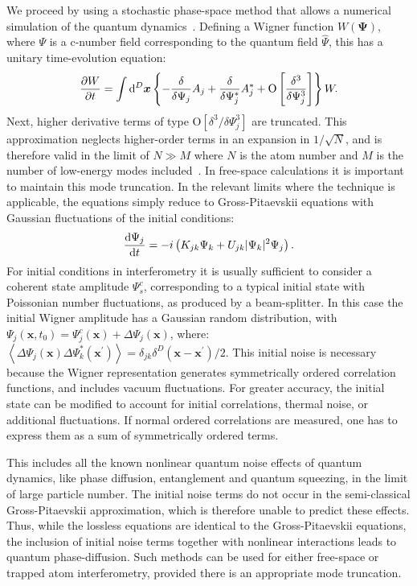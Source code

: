 \documentclass[doublecol]{epl2}
\newcommand{\xvec}{\boldsymbol{x}}
\newcommand{\Psivec}{\boldsymbol{\Psi}}
\begin{document}
We proceed by using a stochastic phase-space method that allows a numerical
simulation of the quantum dynamics~\cite{Drummond1993,Steel1998,Hoffmann2008}.
Defining a Wigner function $W(\Psivec)$, where $\Psi$
is a c-number field corresponding to the quantum field $\hat{\Psi}$, this has a unitary time-evolution equation:
\begin{equation}
	\frac{\partial W}{\partial t} = \int \upd^D\xvec \left\{
		- \frac{\delta}{\delta\Psi_j} A_j
		+ \frac{\delta}{\delta\Psi_j^*}A_j^*
		+ \mbox{O} \left[ \frac{\delta^3}{\delta\Psi_j^3} \right]
	\right\} W.
\end{equation}
Next, higher derivative terms of type $\mbox{O} \left[ \delta^3 / \delta\Psi_j^3 \right]$ are truncated.
This approximation neglects higher-order terms in an expansion in $1 / \sqrt{N}$,
and is therefore valid in the limit of $N \gg M$
where $N$ is the atom number and $M$ is the number of low-energy modes included~\cite{Drummond1993,Sinatra2002,Norrie2006}.
In free-space calculations it is important to maintain this mode truncation.
In the relevant limits where the technique is applicable, the equations
simply reduce to Gross-Pitaevskii equations with Gaussian fluctuations
of the initial conditions:
\begin{equation}
\label{eqn:SDE-1}
	\frac{\mathrm{d}\Psi_j}{\mathrm{d} t} = -i \left(
		K_{jk} \Psi_k + U_{jk} \lvert \Psi_k \rvert^2 \Psi_j
	\right).
\end{equation}
For initial conditions in interferometry it is usually sufficient to consider
a coherent state amplitude $\Psi_s^c$,
corresponding to a typical initial state with Poissonian number fluctuations,
as produced by a beam-splitter.
In this case the initial Wigner amplitude has a Gaussian random distribution, with
$\Psi_j(\xvec, t_0) = \Psi_j^c(\xvec) + \Delta \Psi_j(\xvec)$, where:
$\left\langle \Delta \Psi_j(\xvec) \Delta \Psi_k^*(\xvec^{\prime}) \right\rangle =
\delta_{jk} \delta^D(\xvec - \xvec^{\prime}) / 2.$
This initial noise is necessary because the Wigner representation generates
symmetrically ordered correlation functions, and includes vacuum fluctuations.
For greater accuracy, the initial state can be modified to account for
initial  correlations, thermal noise, or additional fluctuations.
If normal ordered correlations are measured, one has to express them
as a sum of symmetrically ordered terms.

This includes all the known nonlinear quantum noise effects of quantum dynamics,
like phase diffusion, entanglement and quantum squeezing, in the limit
of large particle number.
The initial noise terms do not occur in the semi-classical Gross-Pitaevskii
approximation, which is therefore unable to predict these effects.
Thus, while the lossless equations are identical to the Gross-Pitaevskii
equations, the inclusion of initial noise terms together with nonlinear
interactions leads to quantum phase-diffusion.
Such methods can be used for either free-space or trapped atom interferometry,
provided there is an appropriate mode truncation.
\end{document}

